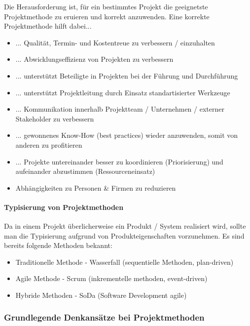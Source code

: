 \documentclass[a4paper]{article}
\begin{document}
			Die Herausforderung ist, für ein bestimmtes Projekt die geeignetste Projektmethode zu eruieren und korrekt anzuwenden.
			Eine korrekte Projektmethode hilft dabei...
			\vspace{1em}
			\begin{itemize}
				\item ... Qualität, Termin- und Kostentreue zu verbessern / einzuhalten
				\item ... Abwicklungseffizienz von Projekten zu verbessern
				\item ... unterstützt Beteiligte in Projekten bei der Führung und Durchführung
				\item ... unterstützt Projektleitung durch Einsatz standartisierter Werkzeuge
				\item ... Kommunikation innerhalb Projektteam / Unternehmen / externer Stakeholder zu verbessern
				\item ... gewonnenes Know-How (best practices) wieder anzuwenden, somit von anderen zu profitieren
				\item ... Projekte untereinander besser zu koordinieren (Priorisierung) und aufeinander abzustimmen (Ressourceneinsatz)
				\item Abhängigkeiten zu Personen \& Firmen zu reduzieren
			\end{itemize}
		
			\paragraph{Typisierung von Projektmethoden}
			
			Da in einem Projekt überlicherweise ein Produkt / System realisiert wird, sollte man die Typisierung aufgrund von Produkteigenschaften vorzunehmen. Es sind bereits folgende Methoden bekannt:
			\vspace{1em}
			\begin{itemize}
				\item Traditionelle Methode - Wasserfall (sequentielle Methoden, plan-driven)
				\item Agile Methode - Scrum (inkrementelle methoden, event-driven)
				\item Hybride Methoden - SoDa (Software Development agile)
			\end{itemize}
	
		\subsubsection{Grundlegende Denkansätze bei Projektmethoden}
			
\end{document}
